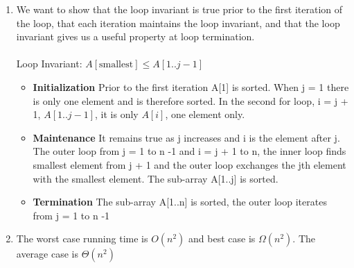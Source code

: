 \documentclass[11pt,fleqn]{book}
\begin{document}
\begin{enumerate}
    \item We want to show that the loop invariant is true prior to the first iteration of the loop, that each iteration maintains the loop invariant, and that the loop invariant gives us a useful property at loop termination.\\ \\
        Loop Invariant: $A[\text{smallest}] \leq A[1..j-1]$
        \begin{itemize}
            \item \textbf{Initialization} Prior to the first iteration A[1] is sorted. When j = 1 there is only one element and is therefore sorted. In the second for loop, i = j + 1, $A[1..j-1]$, it is only $A[i]$, one element only. 
            \item \textbf{Maintenance} It remains true as j increases and i is the element after j. The outer loop from j = 1 to n -1 and i = j + 1 to n, the inner loop finds smallest element from j + 1 and the outer loop exchanges the jth element with the smallest element. The sub-array A[1..j] is sorted. 
            \item \textbf{Termination} The sub-array A[1..n] is sorted, the outer loop iterates from j = 1 to n -1 
        \end{itemize}
        \item The worst case running time is $O(n^2)$ and best case is $\Omega(n^2)$. The average case is $\Theta(n^2)$ 
\end{enumerate}
\end{document}
